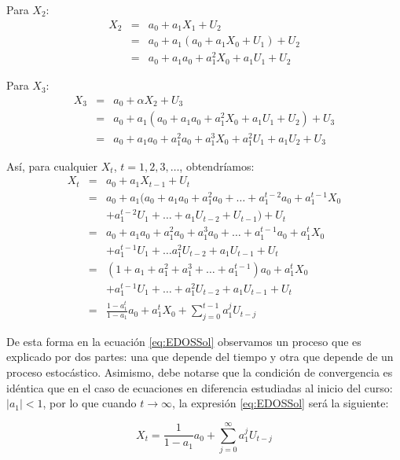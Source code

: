 \documentclass[
]{book}
\begin{document}
Para \(X_2\): \begin{eqnarray*}
X_{2} & = & a_0 + a_1 X_{1} + U_{2} \\
    & = & a_0 + a_1 (a_0 + a_1 X_{0} + U_{1}) + U_{2} \\
    & = & a_0 + a_1 a_0 + a_1^2 X_{0} + a_1 U_{1} + U_{2}
\end{eqnarray*}

Para \(X_3\): \begin{eqnarray*}
X_{3} & = & a_0 + \alpha X_{2} + U_{3} \\
    & = & a_0 + a_1 (a_0 + a_1 a_0 + a_1^2 X_{0} + a_1 U_{1} + U_{2}) + U_{3} \\
    & = & a_0 + a_1 a_0 + a_1^2 a_0 + a_1^3 X_{0} + a_1^2 U_{1} + a_1 U_{2} + U_{3}
\end{eqnarray*}

Así, para cualquier \(X_t\), \(t = 1, 2, 3, \ldots\), obtendríamos:
\begin{eqnarray}
X_{t} & = & a_0 + a_1 X_{t - 1} + U_{t} \nonumber \\
    & = & a_0 + a_1 (a_0 + a_1 a_0 + a_1^2 a_0 + \ldots + a_1^{t-2} a_0 + a_1^{t-1} X_{0} \nonumber \\
    &   & + a_1^{t-2} U_{1} + \ldots + a_1 U_{t - 2} + U_{t - 1}) + U_{t} \nonumber \\
    & = & a_0 + a_1 a_0 + a_1^2 a_0 + a_1^3 a_0 + \ldots + a_1^{t-1} a_0 + a_1^{t} X_{0} \nonumber \\
    &   & + a_1^{t-1} U_{1} + \ldots a_1^2 U_{t - 2} + a_1 U_{t - 1} + U_{t} \nonumber \\
    & = & (1 + a_1 + a_1^2 + a_1^3 + \ldots + a_1^{t-1}) a_0 + a_1^{t} X_{0} \nonumber \\
    &   & + a_1^{t-1} U_{1} + \ldots + a_1^2 U_{t - 2} + a_1 U_{t - 1} + U_{t}  \nonumber\\
    & = & \frac{1 - a_1^t}{1 - a_1} a_0 + a_1^{t} X_{0} + \sum^{t-1}_{j = 0} a_1^{j} U_{t - j} 
    \label{eq:EDOSSol}
\end{eqnarray}

De esta forma en la ecuación \eqref{eq:EDOSSol} observamos un proceso que
es explicado por dos partes: una que depende del tiempo y otra que
depende de un proceso estocástico. Asimismo, debe notarse que la
condición de convergencia es idéntica que en el caso de ecuaciones en
diferencia estudiadas al inicio del curso: \(\lvert a_1 \lvert < 1\), por
lo que cuando \(t \to \infty\), la expresión \eqref{eq:EDOSSol} será la
siguiente:

\begin{equation}
    X_t = \frac{1}{1 - a_1} a_0 + \sum^{\infty}_{j = 0} a_1^{j} U_{t - j}
    \label{eq:EDOSLP}
\end{equation}
\end{document}
